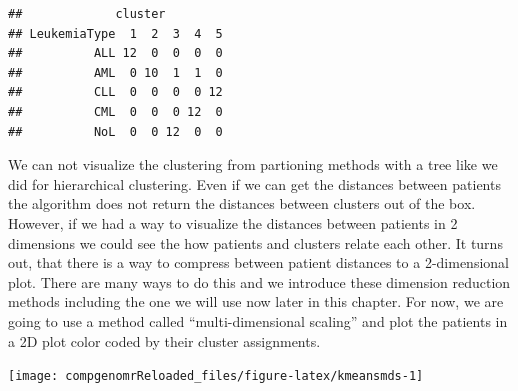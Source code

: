 \documentclass[12pt,]{krantz}
\newenvironment{Shaded}{\begin{snugshade}}{\end{snugshade}}
\newcommand{\CommentTok}[1]{\textcolor[rgb]{0.56,0.35,0.01}{\textit{#1}}}
\newcommand{\DataTypeTok}[1]{\textcolor[rgb]{0.13,0.29,0.53}{#1}}
\newcommand{\DecValTok}[1]{\textcolor[rgb]{0.00,0.00,0.81}{#1}}
\newcommand{\KeywordTok}[1]{\textcolor[rgb]{0.13,0.29,0.53}{\textbf{#1}}}
\newcommand{\NormalTok}[1]{#1}
\newcommand{\OperatorTok}[1]{\textcolor[rgb]{0.81,0.36,0.00}{\textbf{#1}}}
\newcommand{\OtherTok}[1]{\textcolor[rgb]{0.56,0.35,0.01}{#1}}
\newcommand{\StringTok}[1]{\textcolor[rgb]{0.31,0.60,0.02}{#1}}
\theoremstyle{definition}
\theoremstyle{definition}
\theoremstyle{definition}
\theoremstyle{remark}
\begin{document}
\begin{verbatim}
##             cluster
## LeukemiaType  1  2  3  4  5
##          ALL 12  0  0  0  0
##          AML  0 10  1  1  0
##          CLL  0  0  0  0 12
##          CML  0  0  0 12  0
##          NoL  0  0 12  0  0
\end{verbatim}

We can not visualize the clustering from partioning methods with a tree
like we did for hierarchical clustering. Even if we can get the
distances between patients the algorithm does not return the distances
between clusters out of the box. However, if we had a way to visualize
the distances between patients in 2 dimensions we could see the how
patients and clusters relate each other. It turns out, that there is a
way to compress between patient distances to a 2-dimensional plot. There
are many ways to do this and we introduce these dimension reduction
methods including the one we will use now later in this chapter. For
now, we are going to use a method called ``multi-dimensional scaling''
and plot the patients in a 2D plot color coded by their cluster
assignments.

\begin{Shaded}
\end{Shaded}

\begin{center}\texttt{[image: compgenomrReloaded\_files/figure-latex/kmeansmds-1]} \end{center}
\end{document}
